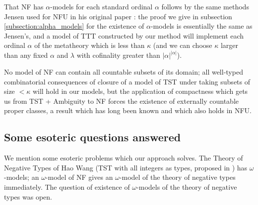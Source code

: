 \documentclass{article}
\theoremstyle{definition}
\theoremstyle{remark}
\begin{document}
That NF has $\alpha$-models for each standard ordinal $\alpha$ follows by the same methods Jensen used for NFU in his original paper \cite{nfu}:  the proof we give in subsection \ref{subsection:alpha_models} for the existence of $\alpha$-models is essentially the same as Jensen's, and a model of TTT constructed by our method will implement each ordinal $\alpha$ of the metatheory which is less than $\kappa$ (and we can choose $\kappa$ larger than any fixed $\alpha$ and $\lambda$ with cofinality greater than $|\alpha|^{|\alpha|}$).

  No model of NF can contain all countable subsets of its domain;  all well-typed combinatorial consequences
of closure of a model of TST under taking subsets of size $<\kappa$ will hold in our models, but the application of compactness which gets us from TST + Ambiguity to NF forces the existence of externally countable proper classes, a result which has long been known and which also holds in NFU.

\subsection{Some esoteric questions answered}

We mention some esoteric problems which our approach solves.  The Theory of Negative Types of Hao Wang (TST with all integers as types, proposed in \cite{tnt})  has $\omega$-models;  an $\omega$-model of NF gives an $\omega$-model of the theory of negative types  immediately.  The question of existence of $\omega$-models of the theory of negative types was open.
\end{document}
